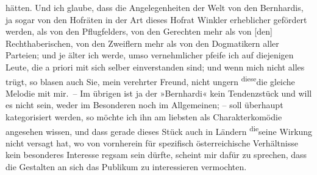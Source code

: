                hätten. Und ich glaube, dass die \introOben{}Angelegenheiten der\introOben{} Welt
               von den Bernhardis, {\pb}ja sogar von den Hofräten in der Art dieses Hofrat Winkler erheblicher
               gefördert werden, als von den Pflugfelders, von \introOben{}den\introOben{} Gerechten mehr als von
                  {[}den{]} Rechthaberischen, von den Zweiflern mehr als von den
               Dogmatikern aller Parteien\introOben{};\introOben{} und je älter ich werde, umso
               vernehmlicher pfeife ich auf diejenigen Leute, die a
               priori mit sich selber einverstanden sind; und wenn mich nicht alles trügt, so blasen
               auch Sie, mein verehrter Freund, nicht ungern \substVorne{}\textsuperscript{diese}\substDazwischen{}die gleiche\substHinten{} Melodie \introOben{}mit mir\introOben{}. – Im übrigen ist ja der »Bernhardi« kein Tendenzstück und will es nicht
               sein, weder im Besonderen noch im Allgemeinen; – soll überhaupt kategorisiert werden,
               so möchte ich ihn am liebsten als Charakterkomödie angesehen wissen, und dass gerade
               dieses Stück auch in Ländern \substVorne{}\textsuperscript{die}\substDazwischen{}seine\substHinten{} Wirkung nicht versagt hat, wo von vornherein für spezifisch österreichische Verhältnisse kein besonderes
               Interesse regsam sein dürfte, scheint mir dafür zu sprechen, dass die Gestalten an
               sich das Publikum zu interessieren vermochten.\pend
           
